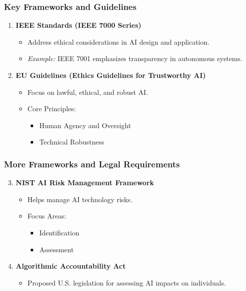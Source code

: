 \documentclass[aspectratio=169]{beamer}
\begin{document}
\begin{frame}[fragile]
    \frametitle{Key Frameworks and Guidelines}
    \begin{enumerate}
        \item \textbf{IEEE Standards (IEEE 7000 Series)}
            \begin{itemize}
                \item Address ethical considerations in AI design and application.
                \item \textit{Example:} IEEE 7001 emphasizes transparency in autonomous systems.
            \end{itemize}
        \item \textbf{EU Guidelines (Ethics Guidelines for Trustworthy AI)}
            \begin{itemize}
                \item Focus on lawful, ethical, and robust AI.
                \item Core Principles: 
                    \begin{itemize}
                        \item Human Agency and Oversight
                        \item Technical Robustness
                    \end{itemize}
            \end{itemize}
    \end{enumerate}
\end{frame}

\begin{frame}[fragile]
    \frametitle{More Frameworks and Legal Requirements}
    \begin{enumerate}
        \setcounter{enumi}{2}
        \item \textbf{NIST AI Risk Management Framework}
            \begin{itemize}
                \item Helps manage AI technology risks.
                \item Focus Areas: 
                    \begin{itemize}
                        \item Identification
                        \item Assessment
                    \end{itemize}
            \end{itemize}
        \item \textbf{Algorithmic Accountability Act}
            \begin{itemize}
                \item Proposed U.S. legislation for assessing AI impacts on individuals.
            \end{itemize}
    \end{enumerate}
\end{frame}
\end{document}
